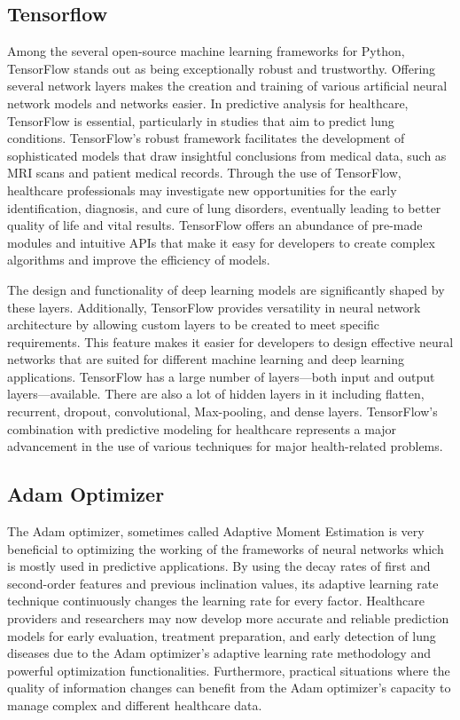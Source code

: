 \subsection{Tensorflow}
Among the several open-source machine learning frameworks for Python, TensorFlow stands out as being exceptionally robust and trustworthy. Offering several network layers makes the creation and training of various artificial neural network models and networks easier. In predictive analysis for healthcare, TensorFlow is essential, particularly in studies that aim to predict lung conditions. TensorFlow's robust framework facilitates the development of sophisticated models that draw insightful conclusions from medical data, such as MRI scans and patient medical records. Through the use of TensorFlow, healthcare professionals may investigate new opportunities for the early identification, diagnosis, and cure of lung disorders, eventually leading to better quality of life and vital results. TensorFlow offers an abundance of pre-made modules and intuitive APIs that make it easy for developers to create complex algorithms and improve the efficiency of models.

The design and functionality of deep learning models are significantly shaped by these layers. Additionally, TensorFlow provides versatility in neural network architecture by allowing custom layers to be created to meet specific requirements. This feature makes it easier for developers to design effective neural networks that are suited for different machine learning and deep learning applications. TensorFlow has a large number of layers—both input and output layers—available. There are also a lot of hidden layers in it including flatten, recurrent, dropout, convolutional, Max-pooling, and dense layers. TensorFlow's combination with predictive modeling for healthcare represents a major advancement in the use of various techniques for major health-related problems. 

\subsection{Adam Optimizer}
The Adam optimizer, sometimes called Adaptive Moment Estimation is very beneficial to optimizing the working of the frameworks of neural networks which is mostly used in predictive applications. By using the decay rates of first and second-order features and previous inclination values, its adaptive learning rate technique continuously changes the learning rate for every factor. Healthcare providers and researchers may now develop more accurate and reliable prediction models for early evaluation, treatment preparation, and early detection of lung diseases due to the Adam optimizer's adaptive learning rate methodology and powerful optimization functionalities. Furthermore, practical situations where the quality of information changes can benefit from the Adam optimizer's capacity to manage complex and different healthcare data. 

